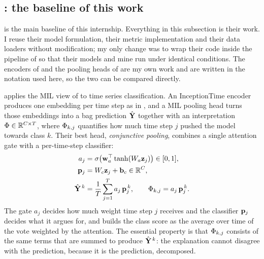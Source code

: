 \subsection{\millet{}: the baseline of this work}
\label{sec:bg:millet}

\begin{priorwork}
\millet{} \citep{early2024millet} is the main baseline of this internship. Everything in this
subsection is their work. I reuse their model formulation, their metric implementation and their
data loaders without modification; my only change was to wrap their code inside the pipeline of
 so that their models and mine run under identical conditions. The
encoders of  and the pooling heads of  are my
own work and are written in the notation used here, so the two can be compared directly.
\end{priorwork}

\millet{} applies the MIL view of  to time series classification. An InceptionTime
encoder produces one embedding per time step as in , and a MIL pooling head
turns those embeddings into a bag prediction $\hat{\mathbf{Y}}$ together with an interpretation
$\Phi \in \mathbb{R}^{C \times T}$, where $\Phi_{k,j}$ quantifies how much time step $j$
pushed the model towards class $k$. Their best head, \emph{conjunctive pooling}, combines a single
attention gate with a per-time-step classifier:
\begin{align}
  a_j       &= \sigma\!\left(\mathbf{w}_a^\top \tanh(W_a \mathbf{z}_j)\right) \in [0,1],
  \label{eq:conj_gate}\\
  \mathbf{p}_j &= W_c \mathbf{z}_j + \mathbf{b}_c \in \mathbb{R}^{C},
  \label{eq:conj_inst}\\
  \hat{\mathbf{Y}}^{\,k} &= \frac{1}{T} \sum_{j=1}^{T} a_j\, \mathbf{p}_j^{\,k},
  \qquad
  \Phi_{k,j} = a_j\, \mathbf{p}_j^{\,k}.
  \label{eq:conj_bag}
\end{align}
The gate $a_j$ decides how much weight time step $j$ receives and the classifier $\mathbf{p}_j$
decides what it argues for, and  builds the class score as the average over time
of the vote weighted by the attention. The essential property is that $\Phi_{k,j}$ consists of the
same terms that are summed to produce $\hat{\mathbf{Y}}^{\,k}$: the explanation cannot disagree with the
prediction, because it is the prediction, decomposed.

